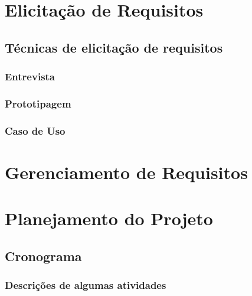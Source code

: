 \newpage

\section{Elicitação de Requisitos}\label{elic}
  
  \subsection{Técnicas de elicitação de requisitos}
    \subsubsection{Entrevista}
    \subsubsection{Prototipagem}
    \subsubsection{Caso de Uso}

\newpage

\section{Gerenciamento de Requisitos}\label{geren}

\newpage

\section{Planejamento do Projeto}\label{plan}

  \subsection{Cronograma}
  \subsubsection{Descrições de algumas atividades}
